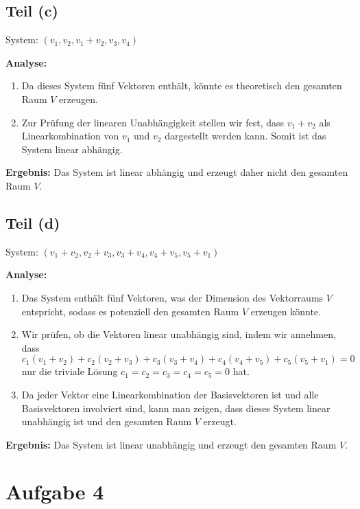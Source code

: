 \documentclass[11pt]{article}
\begin{document}
\subsection*{Teil (c)}

System: \( (v_1, v_2, v_1 + v_2, v_3, v_4) \)

\textbf{Analyse:}

\begin{enumerate}
    \item Da dieses System fünf Vektoren enthält, könnte es theoretisch den gesamten Raum \( V \) erzeugen.
    \item Zur Prüfung der linearen Unabhängigkeit stellen wir fest, dass \( v_1 + v_2 \) als Linearkombination von \( v_1 \) und \( v_2 \) dargestellt werden kann. Somit ist das System linear abhängig.
\end{enumerate}
\textbf{Ergebnis:} Das System ist linear abhängig und erzeugt daher nicht den gesamten Raum \( V \).

\subsection*{Teil (d)}

System: \( (v_1 + v_2, v_2 + v_3, v_3 + v_4, v_4 + v_5, v_5 + v_1) \)

\textbf{Analyse:}

\begin{enumerate}
    \item Das System enthält fünf Vektoren, was der Dimension des Vektorraums \( V \) entspricht, sodass es potenziell den gesamten Raum \( V \) erzeugen könnte.
    \item Wir prüfen, ob die Vektoren linear unabhängig sind, indem wir annehmen, dass \( c_1 (v_1 + v_2) + c_2 (v_2 + v_3) + c_3 (v_3 + v_4) + c_4 (v_4 + v_5) + c_5 (v_5 + v_1) = 0 \) nur die triviale Lösung \( c_1 = c_2 = c_3 = c_4 = c_5 = 0 \) hat.
    \item Da jeder Vektor eine Linearkombination der Basisvektoren ist und alle Basisvektoren involviert sind, kann man zeigen, dass dieses System linear unabhängig ist und den gesamten Raum \( V \) erzeugt.
\end{enumerate}
\textbf{Ergebnis:} Das System ist linear unabhängig und erzeugt den gesamten Raum \( V \).

\section*{Aufgabe 4}
\end{document}
